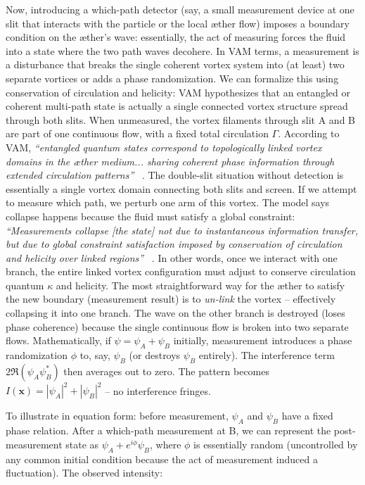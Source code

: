 \documentclass[a4paper, aps,preprint,superscriptaddress, 12pt]{revtex4}
\begin{document}
Now, introducing a which-path detector (say, a small measurement device at one slit that interacts with the particle or the local æther flow) imposes a boundary condition on the æther’s wave: essentially, the act of measuring forces the fluid into a state where the two path waves decohere. In VAM terms, a measurement is a disturbance that breaks the single coherent vortex system into (at least) two separate vortices or adds a phase randomization. We can formalize this using conservation of circulation and helicity: VAM hypothesizes that an entangled or coherent multi-path state is actually a single connected vortex structure spread through both slits. When unmeasured, the vortex filaments through slit A and B are part of one continuous flow, with a fixed total circulation $\Gamma$. According to VAM, \textit{“entangled quantum states correspond to topologically linked vortex domains in the æther medium... sharing coherent phase information through extended circulation patterns”}~\cite{Iskandarani2025c} . The double-slit situation without detection is essentially a single vortex domain connecting both slits and screen. If we attempt to measure which path, we perturb one arm of this vortex. The model says collapse happens because the fluid must satisfy a global constraint: \textit{“Measurements collapse [the state] not due to instantaneous information transfer, but due to global constraint satisfaction imposed by conservation of circulation and helicity over linked regions”}~\cite{Iskandarani2025c} . In other words, once we interact with one branch, the entire linked vortex configuration must adjust to conserve circulation quantum $\kappa$ and helicity. The most straightforward way for the æther to satisfy the new boundary (measurement result) is to \textit{un-link} the vortex – effectively collapsing it into one branch. The wave on the other branch is destroyed (loses phase coherence) because the single continuous flow is broken into two separate flows. Mathematically, if $\psi = \psi_A + \psi_B$ initially, measurement introduces a phase randomization $\phi$ to, say, $\psi_B$ (or destroys $\psi_B$ entirely). The interference term $2\Re(\psi_A\psi_B^*)$ then averages out to zero. The pattern becomes $I(\mathbf{x}) = |\psi_A|^2 + |\psi_B|^2$ – no interference fringes.


To illustrate in equation form: before measurement, $\psi_A$ and $\psi_B$ have a fixed phase relation. After a which-path measurement at B, we can represent the post-measurement state as $\psi_A + e^{i\phi}\psi_B$, where $\phi$ is essentially random (uncontrolled by any common initial condition because the act of measurement induced a fluctuation). The observed intensity:
\end{document}

